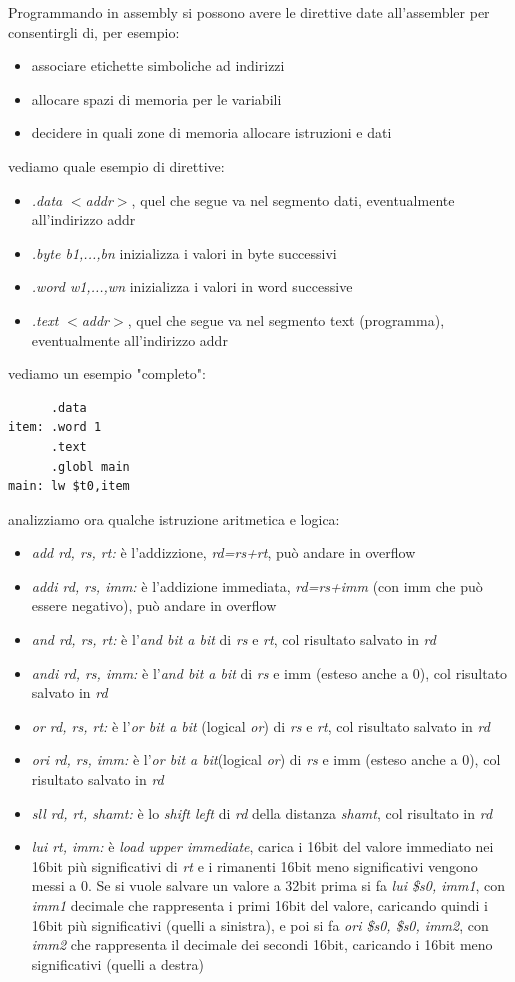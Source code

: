 \documentclass[a4paper,12pt, oneside]{book}
\begin{document}
\newpage
Programmando in assembly si possono avere le direttive date all'assembler per consentirgli di, per esempio:
\begin{itemize}
\item associare etichette simboliche ad indirizzi
\item allocare spazi di memoria per le variabili
\item decidere in quali zone di memoria allocare istruzioni e dati
\end{itemize}
vediamo quale esempio di direttive:
\begin{itemize}
\item \textit{.data} $<$\textit{addr}$>$, quel che segue va nel segmento dati, eventualmente all'indirizzo addr
\item \textit{.byte b1,...,bn} inizializza i valori in byte successivi
\item \textit{.word w1,...,wn} inizializza i valori in word successive
\item \textit{.text} $<$\textit{addr}$>$, quel che segue va nel segmento text (programma), eventualmente all'indirizzo addr
\end{itemize}
vediamo un esempio "completo":
\begin{verbatim}
      .data
item: .word 1
      .text
      .globl main
main: lw $t0,item
\end{verbatim}
analizziamo ora qualche istruzione aritmetica e logica:
\begin{itemize}
\item \textit{add rd, rs, rt:} è l'addizzione, \textit{rd=rs+rt}, può andare in overflow
\item \textit{addi rd, rs, imm:} è l'addizione immediata, \textit{rd=rs+imm} (con imm che può essere negativo), può andare in overflow
\item \textit{and rd, rs, rt:} è l'\textit{and bit a bit} di \textit{rs} e \textit{rt}, col risultato salvato in \textit{rd}
\item \textit{andi rd, rs, imm:} è l'\textit{and bit a bit} di \textit{rs} e imm (esteso anche a 0), col risultato salvato in \textit{rd}
\item \textit{or rd, rs, rt:} è l'\textit{or bit a bit} (logical \textit{or}) di \textit{rs} e \textit{rt}, col risultato salvato in \textit{rd}
\item \textit{ori rd, rs, imm:} è l'\textit{or bit a bit}(logical \textit{or}) di \textit{rs} e imm (esteso anche a 0), col risultato salvato in \textit{rd}
\item \textit{sll rd, rt, shamt:} è lo \textit{shift left} di \textit{rd} della distanza \textit{shamt}, col risultato in \textit{rd}
\item \textit{lui rt, imm:} è \textit{load upper immediate}, carica i 16bit del valore immediato nei 16bit più significativi di \textit{rt} e i rimanenti 16bit meno significativi vengono messi a 0. Se si vuole salvare un valore a 32bit prima si fa \textit{lui \$s0, imm1}, con \textit{imm1} decimale che rappresenta i primi 16bit del valore, caricando quindi i 16bit più significativi (quelli a sinistra), e poi si fa \textit{ori \$s0, \$s0, imm2}, con \textit{imm2} che rappresenta il decimale dei secondi 16bit, caricando i 16bit meno significativi (quelli a destra)
\end{itemize}
\end{document}
